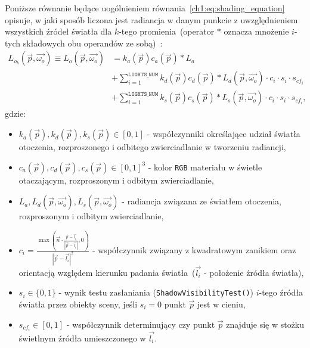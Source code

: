 \begin{enumerate}
Poniższe równanie będące uogólnieniem równania~\eqref{ch1:eq:shading_equation} opisuje, w jaki sposób liczona jest radiancja w danym punkcie z uwzględnieniem wszystkich źródeł światła dla $k$-tego promienia~(operator $*$ oznacza mnożenie $i$-tych składowych obu operandów ze sobą)~\cite{RTFTGU}:
\begin{align}
\label{ch3:eq:shading_equation_general}
L_{o_k}(\vec{p}, \vec{\omega_o}) \equiv L_o(\vec{p}, \vec{\omega_o}) &= k_a(\vec{p})c_a(\vec{p}) * L_a\nonumber\\
&+ \sum_{i=1}^{\mathtt{LIGHTS\_NUM}} k_d(\vec{p})c_d(\vec{p}) * L_d(\vec{p}, \vec{\omega_o}) \cdot c_i\cdot s_i\cdot s_{cf_i} \nonumber\\
&+ \sum_{i=1}^{\mathtt{LIGHTS\_NUM}} k_s(\vec{p})c_s(\vec{p}) * L_s(\vec{p}, \vec{\omega_o}) \cdot c_i\cdot s_i\cdot s_{cf_i},
\end{align}
gdzie:
\begin{itemize}
\item $k_a(\vec{p}), k_d(\vec{p}), k_s(\vec{p}) \in [0, 1]$ - współczynniki określające udział światła otoczenia, rozproszonego i odbitego zwierciadlanie w tworzeniu radiancji,
\item $c_a(\vec{p}), c_d(\vec{p}), c_s(\vec{p}) \in [0, 1]^3$ - kolor \texttt{RGB} materiału w świetle otaczającym, rozproszonym i odbitym zwierciadlanie,
\item $L_a, L_d(\vec{p}, \vec{\omega_o}), L_s(\vec{p}, \vec{\omega_o})$ - radiancja związana ze światłem otoczenia, rozproszonym i odbitym zwierciadlanie,
\item $c_i = \frac{\max\left(\vec{n} \cdot \frac{\vec{p} - \vec{l_i}}{|\vec{p} - \vec{l_i}|}  , 0\right)}{|\vec{p} - \vec{l_i}|^2} $ - współczynnik związany z kwadratowym zanikiem oraz orientacją względem kierunku padania światła~($\vec{l_i}$ - położenie źródła światła),
\item $s_i\in\lbrace 0, 1 \rbrace$ - wynik testu zasłaniania (\texttt{ShadowVisibilityTest()}) $i$-tego źródła światła przez obiekty sceny, jeśli $s_i=0$ punkt $\vec{p}$ jest w cieniu,
\item $s_{cf_i}\in[0, 1]$ - współczynnik determinujący czy punkt $\vec{p}$ znajduje się w stożku świetlnym źródła umieszczonego w $\vec{l_i}$.
\end{itemize}


\end{enumerate}
